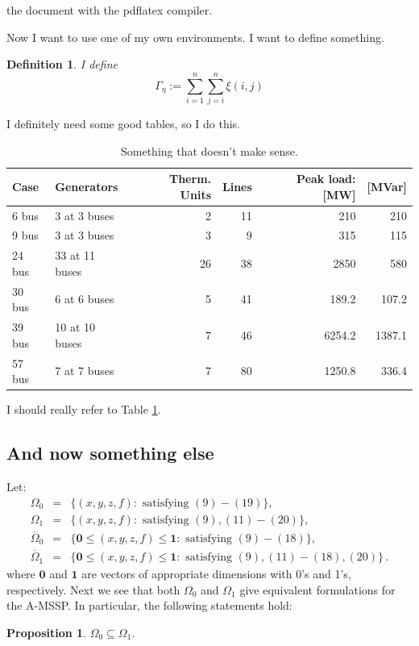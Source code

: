 \documentclass[11pt,twoside]{article}
\newtheorem{Definition}{Definition}
\newtheorem{Proposition}{Proposition}
\numberwithin{Theorem}{section}
\numberwithin{Definition}{section}
\numberwithin{Lemma}{section}
\numberwithin{Algorithm}{section}
\numberwithin{equation}{section}
\begin{document}
the document with the pdflatex compiler.

Now I want to use one of my own environments. I want to define something.
\begin{Definition}
 I define
$$
\Gamma_{\eta}:=\sum_{i=1}^{n}\sum_{j=i}^{n}\xi{}(i,j)
$$
\end{Definition}
I definitely need some good tables, so I do this.
\begin{table}[!ht]
\centering
\begin{tabular}{|ll|rrrr|}
\hline
Case&Generators&Therm. Units&Lines&Peak load: [MW]&[MVar]\\
\hline\hline
6 bus&3 at 3 buses&2&11&210&210\\
9 bus&3 at 3 buses&3&9&315&115\\
24 bus&33 at 11 buses&26&38&2850&580\\
30 bus&6 at 6 buses&5&41&189.2&107.2\\
39 bus&10 at 10 buses&7&46&6254.2&1387.1\\
57 bus&7 at 7 buses&7&80&1250.8&336.4\\
\hline
\end{tabular}
\caption{Something that doesn't make sense.}
\label{tab:things}
\end{table}
I should really refer to Table \ref{tab:things}.

\subsection{And now something else}

\noindent
Let:
\begin{eqnarray*}
\Omega_0 & = & \{(x,y,z,f): \text{ satisfying } (9)-(19)\}, \\
\Omega_1 & = & \{(x,y,z,f): \text{ satisfying } (9),(11)-(20)\}, \\
\overline{\Omega}_0 & = & \{\textbf{0}\leq (x,y,z,f) \leq \textbf{1}: \text{ satisfying } (9)-(18)\}, \\
\overline{\Omega}_1 & = & \{\textbf{0}\leq (x,y,z,f) \leq \textbf{1}: \text{ satisfying } (9),(11)-(18),(20)\} \,.
\end{eqnarray*}
%
where $\textbf{0}$ and $\textbf{1}$ are vectors of appropriate dimensions with 0's and 1's, respectively.
Next we see that both $\Omega_0$ and $\Omega_1$ give equivalent formulations for the A-MSSP. In particular, the following statements hold:

\begin{Proposition}
$\Omega_0 \subseteq \Omega_1$.
\end{Proposition}
\end{document}
